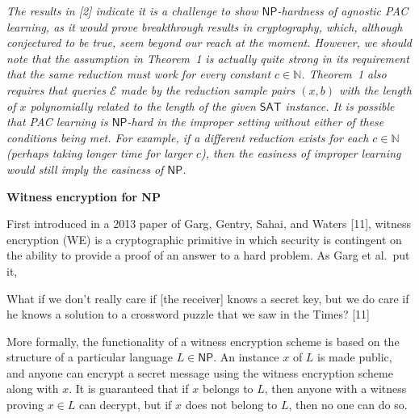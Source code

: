 \documentclass[10pt,a4paper]{article}
\begin{document}
\emph{The results in [2] indicate it is a challenge to show ${\mathsf{NP}}$-hardness of agnostic PAC learning, as it would prove breakthrough results in cryptography, which, although conjectured to be true, seem beyond our reach at the moment. However,
we should note that the assumption in Theorem 1 is actually quite strong in its requirement that the same reduction must work for every constant $c\in\mathbb{N}$. Theorem 1 also requires that queries $\mathcal{E}$ made by the reduction sample pairs $(x,b)$ with the length of $x$ polynomially related to the length of the given ${\mathsf{SAT}}$ instance. It is possible that PAC learning is ${\mathsf{NP}}$-hard in the improper setting without either of these conditions being met. For example, if a different reduction exists for each $c\in\mathbb{N}$ (perhaps taking longer time for larger $c$), then the easiness of improper learning would still imply the easiness of ${\mathsf{NP}}$.}\par







\par\medskip\noindent\textbf{Witness encryption for NP}\par




First introduced in a 2013 paper of Garg, Gentry, Sahai, and Waters [11], witness encryption (WE) is a cryptographic primitive in which security is contingent on the ability to provide a proof of an answer to a hard problem. As Garg et al. put it,\par



What if we don’t really care if [the receiver] knows a secret key, but we do care if he knows a solution to a crossword puzzle that we saw in the Times? [11]\par



More formally, the functionality of a witness encryption scheme is based on the structure of a particular language $L\in{\mathsf{NP}}$. An instance $x$ of $L$ is made public, and anyone can encrypt a secret message using the witness encryption scheme along with $x$. It is guaranteed that if $x$ belongs to $L$, then anyone with a witness proving $x\in L$ can decrypt, but if $x$ does not belong to $L$, then no one can do so.\par
\end{document}
